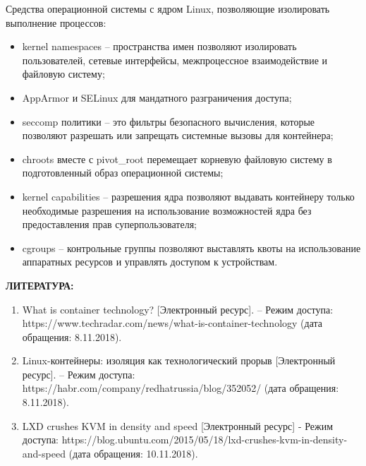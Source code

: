 \par Средства операционной системы с ядром Linux, позволяющие изолировать выполнение процессов:
\begin{itemize}
\item kernel namespaces -- пространства имен позволяют изолировать пользователей, сетевые интерфейсы, межпроцессное взаимодействие и файловую систему;
\item AppArmor и SELinux для мандатного разграничения доступа;
\item seccomp политики -- это фильтры безопасного вычисления, которые позволяют разрешать или запрещать системные вызовы для контейнера;
\item chroots вместе с pivot\_root перемещает корневую файловую систему в подготовленный образ операционной системы;
\item kernel capabilities -- разрешения ядра позволяют выдавать контейнеру только необходимые разрешения на использование возможностей ядра без предоставления прав суперпользователя;
\item cgroups -- контрольные группы позволяют выставлять квоты на использование аппаратных ресурсов и управлять доступом к устройствам.
\end{itemize}
\vspace{\baselineskip}

\begin{center}
\textbf{ЛИТЕРАТУРА:}
\end{center}

\begin{enumerate}
\item What is container technology? [Электронный ресурс]. – Режим доступа: https://www.techradar.com/news/what-is-container-technology (дата обращения: 8.11.2018).
\item Linux-контейнеры: изоляция как технологический прорыв [Электронный ресурс]. – Режим доступа: https://habr.com/company/redhatrussia/blog/352052/ (дата обращения: 8.11.2018).
\item LXD crushes KVM in density and speed [Электронный ресурс] - Режим доступа: https://blog.ubuntu.com/2015/05/18/lxd-crushes-kvm-in-density-and-speed (дата обращения: 10.11.2018).
\end{enumerate}
\clearpage